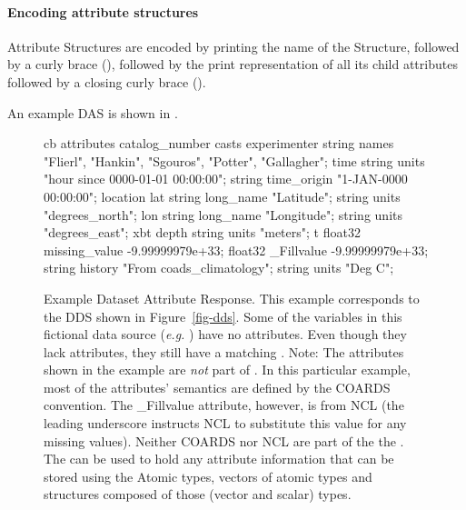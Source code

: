 \documentclass[justify]{nasa-ese}
\renewcommand{\Figureref}[2][here]{\texorhtml{Figure~\ref{#2}}{\link{#1}{#2}}}
\begin{document}
\paragraph{Encoding attribute structures} Attribute Structures are encoded
  by printing the name of the Structure, followed by a curly brace
  (\lit{\{}), followed by the print representation of all its child
  attributes followed by a closing curly brace (\lit{\}}).


An example \ac{DAS} is shown in \Figureref[Figure 6]{fig-das}.

\begin{figure}
\begin{vcode}{cb}
attributes {
   catalog_number {
   }
   casts {
      experimenter {
      	 string names "Flierl", "Hankin", "Sgouros", "Potter", "Gallagher";
      }
      time {
         string units "hour since 0000-01-01 00:00:00";
         string time_origin "1-JAN-0000 00:00:00";
      }
      location {
         lat {
            string long_name "Latitude";
            string units "degrees_north";
         }
         lon {
            string long_name "Longitude";
            string units "degrees_east";
         }
      }
      xbt {
         depth {
            string units "meters";
         }
         t {
            float32 missing_value -9.99999979e+33;
            float32 _Fillvalue -9.99999979e+33;
            string history "From coads_climatology";
            string units "Deg C";
         }
      }
   }
}
\end{vcode}

\caption[Example Dataset Attribute Response.]{Example Dataset
  Attribute Response. This example corresponds to the DDS shown in
  Figure~\ref{fig-dds}. Some of the variables in this fictional data
  source ({\it e.g.} ) have no attributes. Even
  though they lack attributes, they still have a matching \Attribute
  \Structure. Note: The attributes shown in the example are \emph{not}
  part of \DAP. In this particular example, most of the attributes'
  semantics are defined by the COARDS convention. The \_Fillvalue
  attribute, however, is from NCL\cite{NCL} (the leading underscore
  instructs NCL to substitute this value for any missing values).
  Neither COARDS nor NCL are part of the the \DAP. The \DAP \Attribute
  can be used to hold any attribute information that can be stored
  using the Atomic types, vectors of atomic types and structures
  composed of those (vector and scalar) types.}

\label{fig-das}
\end{figure}
\end{document}
